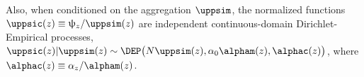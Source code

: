 \documentclass[12pt]{report}
\begin{document}
Also, when conditioned on the aggregation $\uppsim$, the normalized functions $\uppsic(z) \equiv \uppsi_z / \uppsim(z)$ are independent continuous-domain Dirichlet-Empirical processes, $\uppsic(z) | \uppsim(z) \sim \DEP\big(N \uppsim(z), \alpha_0 \alpham(z), \alphac(z)\big)$, where $\alphac(z) \equiv \alpha_z / \alpham(z)$.







%
%
%
\end{document}
